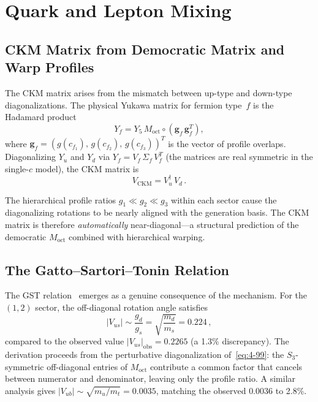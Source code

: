 \section{Quark and Lepton Mixing}
\label{sec:4-ckm}

\subsection{CKM Matrix from Democratic Matrix and Warp Profiles}
\label{sec:4-ckm-mechanism}

The CKM matrix arises from the mismatch between up-type and down-type diagonalizations. The physical Yukawa matrix for fermion type~$f$ is the Hadamard product
\begin{equation}
  Y_f = Y_5\, M_{\mathrm{oct}} \circ (\mathbf{g}_f\, \mathbf{g}_f^T),
  \label{eq:4-99}
\end{equation}
where $\mathbf{g}_f = (g(c_{f_1}),\, g(c_{f_2}),\, g(c_{f_3}))^T$ is the vector of profile overlaps. Diagonalizing $Y_u$ and $Y_d$ via $Y_f = V_f\, \Sigma_f\, V_f^T$ (the matrices are real symmetric in the single-$c$ model), the CKM matrix is
\begin{equation}
  V_{\mathrm{CKM}} = V_u^\dagger\, V_d\,.
  \label{eq:4-100}
\end{equation}

The hierarchical profile ratios $g_1 \ll g_2 \ll g_3$ within each sector cause the diagonalizing rotations to be nearly aligned with the generation basis. The CKM matrix is therefore \emph{automatically} near-diagonal---a structural prediction of the democratic $M_{\mathrm{oct}}$ combined with hierarchical warping.

\subsection{The Gatto--Sartori--Tonin Relation}
\label{sec:4-gst}

The GST relation~\cite{ch4:GST1968} emerges as a genuine consequence of the mechanism. For the $(1,2)$ sector, the off-diagonal rotation angle satisfies
\begin{equation}
  |V_{us}| \sim \frac{g_d}{g_s} = \sqrt{\frac{m_d}{m_s}} = 0.224\,,
  \label{eq:4-101}
\end{equation}
compared to the observed value $|V_{us}|_{\mathrm{obs}} = 0.2265$ (a 1.3\% discrepancy). The derivation proceeds from the perturbative diagonalization of~\eqref{eq:4-99}: the $S_3$-symmetric off-diagonal entries of $M_{\mathrm{oct}}$ contribute a common factor that cancels between numerator and denominator, leaving only the profile ratio. A similar analysis gives $|V_{ub}| \sim \sqrt{m_u/m_t} = 0.0035$, matching the observed $0.0036$ to 2.8\%.

